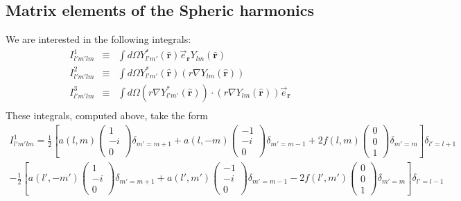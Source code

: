 \documentclass[aps,prb,floatfix,epsfig,singlecolumn,showpacs,preprintnumbers]{revtex4}
\renewcommand{\vr}{{\mathbf{r}}}
\begin{document}
\subsection{Matrix elements of the Spheric harmonics}
\label{OnRealHarm}

We are interested in the following integrals:
\begin{eqnarray}
I^1_{l'm'lm} &\equiv& \int d\Omega Y^*_{l'm'}(\hat{\vr}) \vec{e}_\vr  Y_{lm}(\hat{\vr}) \\
I^2_{l'm'lm} &\equiv& \int d\Omega Y^*_{l'm'}(\hat{\vr}) (r\nabla Y_{lm}(\hat{\vr})) \\
I^3_{l'm'lm} &\equiv& \int d\Omega (r\nabla Y^*_{l'm'}(\hat{\vr}))\cdot ( r\nabla  Y_{lm}(\hat{\vr})) \vec{e}_\vr\\
\end{eqnarray}
These integrals, computed above, take the form
\begin{eqnarray}
I^1_{l'm'lm}=
\frac{1}{2}
\left[
a(l,m)
\left(
\begin{array}{c}
1\\
-i\\
0
\end{array}
\right)
\delta_{m'=m+1}
+a(l,-m)
\left(
\begin{array}{c}
-1\\
-i\\
0
\end{array}
\right)
\delta_{m'=m-1}
+2 f(l,m)
\left(
\begin{array}{c}
0\\
0\\
1
\end{array}
\right)
\delta_{m'=m}
\right]\delta_{l'=l+1}
\nonumber\\
-\frac{1}{2}
\left[
a(l',-m')
\left(
\begin{array}{c}
1\\
-i\\
0
\end{array}
\right)
\delta_{m'=m+1}
+a(l',m')
\left(
\begin{array}{c}
-1\\
-i\\
0
\end{array}
\right)
\delta_{m'=m-1}
-2 f(l',m')
\left(
\begin{array}{c}
0\\
0\\
1
\end{array}
\right)
\delta_{m'=m}
\right]\delta_{l'=l-1}
\end{eqnarray}
\end{document}
